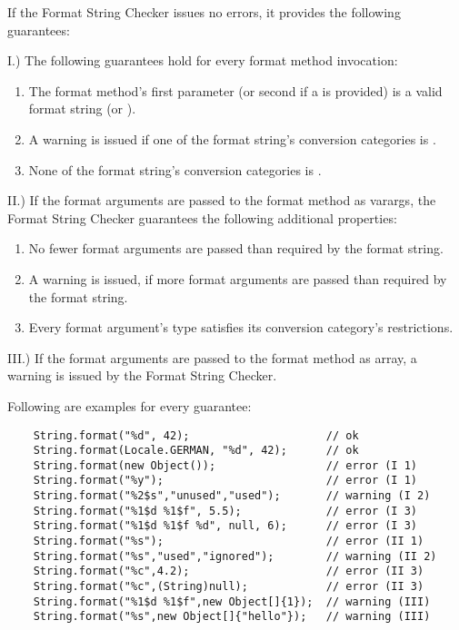 If the Format String Checker issues no errors, it provides the following guarantees:

\noindent I.) The following guarantees hold for every format method invocation:

\begin{enumerate} 
    \item The format method's first parameter (or second if a  is provided) is a valid 
        format string (or ).
    \item A warning is issued if one of the format string's conversion categories is .
    \item None of the format string's conversion categories is .
\end{enumerate} 

\noindent II.) If the format arguments are passed to the format method as varargs, the
Format String Checker guarantees the following additional properties:

\begin{enumerate} 
\item No fewer format arguments are passed than required by the format string.
\item A warning is issued, if more format arguments are passed than required by the format string.
\item Every format argument's type satisfies its conversion category's restrictions.
\end{enumerate}

\noindent III.) If the format arguments are passed to the format method as array, 
a warning is issued by the Format String Checker.

\noindent Following are examples for every guarantee:

\begin{Verbatim}
    String.format("%d", 42);                     // ok
    String.format(Locale.GERMAN, "%d", 42);      // ok
    String.format(new Object());                 // error (I 1)
    String.format("%y");                         // error (I 1)
    String.format("%2$s","unused","used");       // warning (I 2)
    String.format("%1$d %1$f", 5.5);             // error (I 3)
    String.format("%1$d %1$f %d", null, 6);      // error (I 3)
    String.format("%s");                         // error (II 1)
    String.format("%s","used","ignored");        // warning (II 2)
    String.format("%c",4.2);                     // error (II 3)
    String.format("%c",(String)null);            // error (II 3)
    String.format("%1$d %1$f",new Object[]{1});  // warning (III)
    String.format("%s",new Object[]{"hello"});   // warning (III)
\end{Verbatim}

